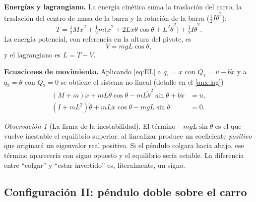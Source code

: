 \documentclass[11pt,letterpaper]{article}
\theoremstyle{definition}
\theoremstyle{plain}
\theoremstyle{remark}
\newtheorem{observacion}[definicion]{Observación}
\begin{document}
\textbf{Energías y lagrangiano.} La energía cinética suma la traslación
del carro, la traslación del centro de masa de la barra y la rotación de
la barra ($\tfrac12 I\dot\theta^2$):
\begin{equation}\label{eq:T-simple}
  T=\tfrac12 M\dot x^2
   +\tfrac12 m\bigl(\dot x^2+2L\dot x\dot\theta\cos\theta+L^2\dot\theta^2\bigr)
   +\tfrac12 I\dot\theta^2.
\end{equation}
La energía potencial, con referencia en la altura del pivote, es
\begin{equation}\label{eq:V-simple}
  V=mgL\cos\theta,
\end{equation}
y el lagrangiano es $L=T-V$.

\textbf{Ecuaciones de movimiento.} Aplicando \cref{eq:EL} a $q_1=x$ con
$Q_1=u-b\dot x$ y a $q_2=\theta$ con $Q_2=0$ se obtiene el sistema no
lineal (detalle en el \cref{anx:lag})
\begin{subequations}\label{eq:nl-simple}
\begin{align}
  (M{+}m)\ddot x+mL\ddot\theta\cos\theta
    -mL\dot\theta^2\sin\theta+b\dot x &= u,\\
  (I{+}mL^2)\ddot\theta+mL\ddot x\cos\theta
    -mgL\sin\theta &= 0.
\end{align}
\end{subequations}

\begin{observacion}[La firma de la inestabilidad]
\label{obs:firma}
El término $-mgL\sin\theta$ es el que vuelve inestable el equilibrio
superior: al linealizar produce un coeficiente \emph{positivo} que
originará un eigenvalor real positivo. Si el péndulo colgara hacia abajo,
ese término aparecería con signo opuesto y el equilibrio sería estable.
La diferencia entre ``colgar'' y ``estar invertido'' es, literalmente, un
signo.
\end{observacion}

\subsection{Configuración II: péndulo doble sobre el carro}
\label{sub:doble}
\end{document}
